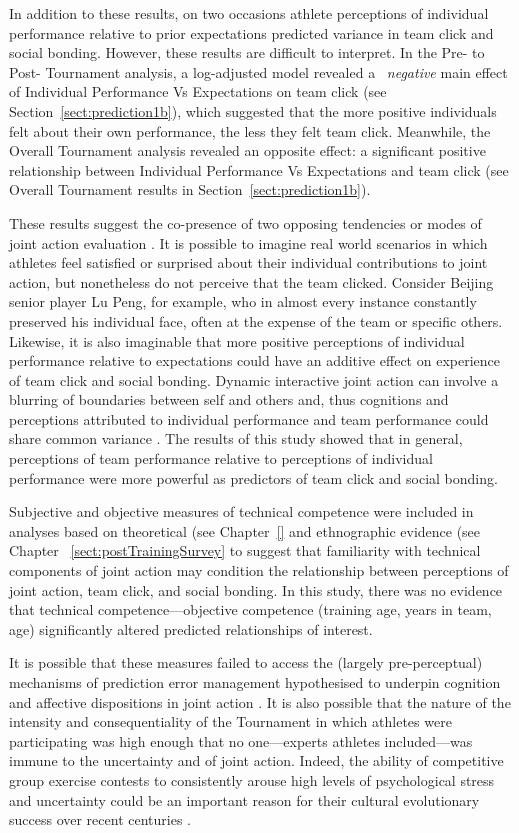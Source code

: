 \begin{CJK}{UTF8}{gbsn}
In addition to these results, on two occasions athlete perceptions of individual performance relative to prior expectations predicted variance in team click and social bonding. However, these results are difficult to interpret.  In the Pre- to Post- Tournament analysis, a log-adjusted model revealed a ~\textit{negative} main effect of Individual Performance Vs Expectations on team click (see Section~\ref{sect:prediction1b}), which suggested that the more positive individuals felt about their own performance, the less they felt team click. Meanwhile, the Overall Tournament analysis revealed an opposite effect: a significant positive relationship between Individual Performance Vs Expectations and team click (see Overall Tournament results in Section~\ref{sect:prediction1b}).

These results suggest the co-presence of two opposing tendencies or modes of joint action evaluation \citep{Friston2015a}. It is possible to imagine real world scenarios in which athletes feel satisfied or surprised about their individual contributions to joint action, but nonetheless do not perceive that the team clicked.  Consider Beijing senior player Lu Peng, for example, who in almost every instance constantly preserved his individual face, often at the expense of the team or specific others.  Likewise, it is also imaginable that more positive perceptions of individual performance relative to expectations could have an additive effect on experience of team click and social bonding.  Dynamic interactive joint action can involve a blurring of boundaries between self and others and, thus cognitions and perceptions attributed to individual performance and team performance could share common variance \citep{Friston2015}.  The results of this study showed that in general, perceptions of team performance relative to perceptions of individual performance were more powerful as predictors of team click and social bonding.


Subjective and objective measures of technical competence were included in analyses based on theoretical (see Chapter~\ref{} and ethnographic evidence (see Chapter ~\ref{sect:postTrainingSurvey} to suggest that familiarity with technical components of joint action may condition the relationship between perceptions of joint action, team click, and social bonding.  In this study, there was no evidence that technical competence---objective competence (training age, years in team, age) significantly altered predicted relationships of interest.

It is possible that these measures failed to access the (largely pre-perceptual) mechanisms of prediction error management hypothesised to underpin cognition and affective dispositions in joint action \citep{Clark2013}.  It is also possible that the nature of the intensity and consequentiality of the Tournament in which athletes were participating was high enough that no one---experts athletes included---was immune to the uncertainty and of joint action.  Indeed, the ability of competitive group exercise contests to consistently arouse high levels of psychological stress and uncertainty could be an important reason for their cultural evolutionary success over recent centuries \citep{Dunbar2010,Whitehouse2004}.


\end{CJK}
